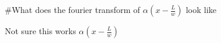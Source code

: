 #What does the fourier transform of $\alpha\left(x-\frac{L}{w}\right)$ look like


Not sure this works $\alpha\left(x-\frac{L}{w}\right)$
